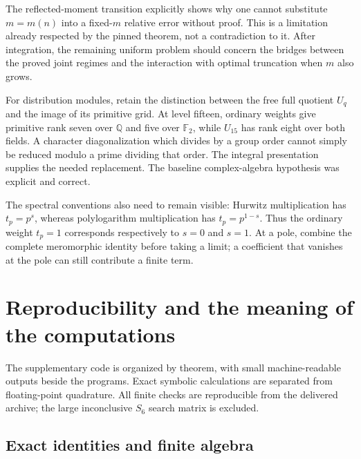 \documentclass[11pt,a4paper]{article}
\numberwithin{equation}{section}
\theoremstyle{plain}
\theoremstyle{definition}
\theoremstyle{remark}
\begin{document}
The reflected-moment transition explicitly shows why one cannot
substitute $m=m(n)$ into a fixed-$m$ relative error without proof.
This is a limitation already respected by the pinned theorem, not
a contradiction to it. After integration, the remaining uniform
problem should concern the bridges between the proved joint regimes
and the interaction with optimal truncation when $m$ also grows.

For distribution modules, retain the distinction between the free
full quotient $U_q$ and the image of its primitive grid. At level
fifteen, ordinary weights give primitive rank seven over
$\mathbb Q$ and five over $\mathbb F_2$, while $U_{15}$ has rank
eight over both fields. A character diagonalization which divides
by a group order cannot simply be reduced modulo a prime dividing
that order. The integral presentation supplies the needed replacement.
The baseline complex-algebra hypothesis was explicit and correct.

The spectral conventions also need to remain visible: Hurwitz
multiplication has $t_p=p^s$, whereas polylogarithm multiplication
has $t_p=p^{1-s}$. Thus the ordinary weight $t_p=1$ corresponds
respectively to $s=0$ and $s=1$. At a pole, combine the complete
meromorphic identity before taking a limit; a coefficient that
vanishes at the pole can still contribute a finite term.

\section{Reproducibility and the meaning of the computations}
\label{cont:sec:verification}

The supplementary code is organized by theorem, with small
machine-readable outputs beside the programs. Exact symbolic
calculations are separated from floating-point quadrature.
All finite checks are reproducible from the delivered archive;
the large inconclusive $S_6$ search matrix is excluded.

\subsection{Exact identities and finite algebra}
\end{document}
